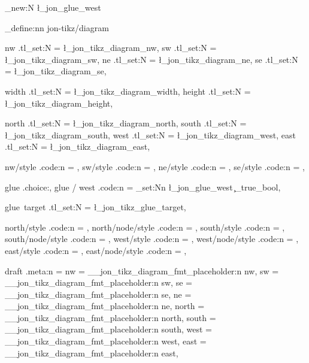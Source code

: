 \newlength{\dontworryaboutit}



\ExplSyntaxOn

\bool_new:N \l_jon_glue_west

\keys_define:nn { jon-tikz/diagram } {
  nw .tl_set:N = \l_jon_tikz_diagram_nw,
  sw .tl_set:N = \l_jon_tikz_diagram_sw,
  ne .tl_set:N = \l_jon_tikz_diagram_ne,
  se .tl_set:N = \l_jon_tikz_diagram_se,

  width .tl_set:N = \l_jon_tikz_diagram_width,
  height .tl_set:N = \l_jon_tikz_diagram_height,

  north .tl_set:N = \l_jon_tikz_diagram_north,
  south .tl_set:N = \l_jon_tikz_diagram_south,
  west .tl_set:N = \l_jon_tikz_diagram_west,
  east .tl_set:N = \l_jon_tikz_diagram_east,

  nw/style .code:n = {},
  sw/style .code:n = {},
  ne/style .code:n = {},
  se/style .code:n = {},

  glue .choice:,
  glue / west .code:n = {\bool_set:Nn \l_jon_glue_west \c_true_bool},

  glue~target .tl_set:N = \l_jon_tikz_glue_target,

  north/style .code:n = {},
  north/node/style .code:n = {},
  south/style .code:n = {},
  south/node/style .code:n = {},
  west/style .code:n = {},
  west/node/style .code:n = {},
  east/style .code:n = {},
  east/node/style .code:n = {},

  draft .meta:n = {
    nw = {\__jon_tikz_diagram_fmt_placeholder:n {nw}},
    sw = {\__jon_tikz_diagram_fmt_placeholder:n {sw}},
    se = {\__jon_tikz_diagram_fmt_placeholder:n {se}},
    ne = {\__jon_tikz_diagram_fmt_placeholder:n {ne}},
    north = {\__jon_tikz_diagram_fmt_placeholder:n {north}},
    south = {\__jon_tikz_diagram_fmt_placeholder:n {south}},
    west = {\__jon_tikz_diagram_fmt_placeholder:n {west}},
    east = {\__jon_tikz_diagram_fmt_placeholder:n {east}},
  }
}

